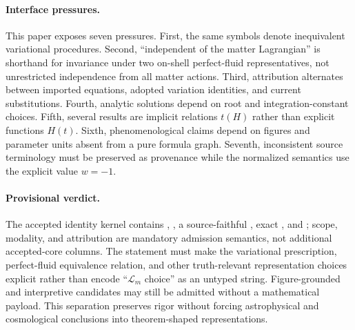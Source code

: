 \paragraph{Interface pressures.}
This paper exposes seven pressures. First, the same symbols denote inequivalent variational procedures. Second, ``independent of the matter Lagrangian'' is shorthand for invariance under two on-shell perfect-fluid representatives, not unrestricted independence from all matter actions. Third, attribution alternates between imported equations, adopted variation identities, and current substitutions. Fourth, analytic solutions depend on root and integration-constant choices. Fifth, several results are implicit relations $t(H)$ rather than explicit functions $H(t)$. Sixth, phenomenological claims depend on figures and parameter units absent from a pure formula graph. Seventh, inconsistent source terminology must be preserved as provenance while the normalized semantics use the explicit value $w=-1$.

\paragraph{Provisional verdict.}
\begin{sloppypar}
The accepted identity kernel contains , , a source-faithful , exact , and ; scope, modality, and attribution are mandatory admission semantics, not additional accepted-core columns. The statement must make the variational prescription, perfect-fluid equivalence relation, and other truth-relevant representation choices explicit rather than encode ``$\mathcal L_m$ choice'' as an untyped string. Figure-grounded and interpretive candidates may still be admitted without a mathematical payload. This separation preserves rigor without forcing astrophysical and cosmological conclusions into theorem-shaped representations.
\end{sloppypar}